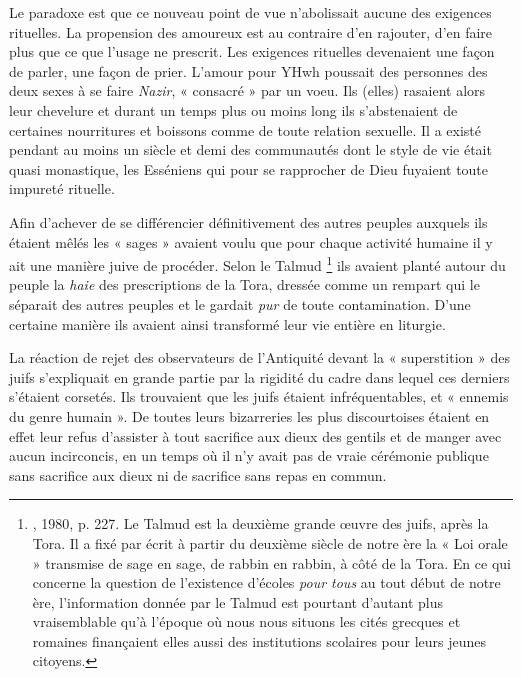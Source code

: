 Le paradoxe est que ce nouveau point de vue n'abolissait aucune des exigences rituelles. La propension des amoureux est au contraire d'en rajouter, d'en faire plus que ce que l'usage ne prescrit. Les exigences rituelles devenaient une façon de parler, une façon de prier. L'amour pour YHwh poussait des personnes des deux sexes à se faire \emph{Nazir}, « consacré » par un voeu. Ils (elles) rasaient alors leur chevelure et durant un temps plus ou moins long ils s'abstenaient de certaines nourritures et boissons comme de toute relation sexuelle. Il a existé pendant au moins un siècle et demi des communautés dont le style de vie était quasi monastique, les Esséniens qui pour se rapprocher de Dieu fuyaient toute impureté rituelle.
 
 Afin d'achever de se différencier définitivement des autres peuples auxquels ils étaient mêlés les « sages » avaient voulu que pour chaque activité humaine il y ait une manière juive de procéder. Selon le Talmud%
\footnote{, 1980, p. 227. Le Talmud est la deuxième grande œuvre des juifs, après la Tora. Il a fixé par écrit à partir du deuxième siècle de notre ère la « Loi orale » transmise de sage en sage, de rabbin en rabbin, à côté de la Tora. En ce qui concerne la question de l'existence d'écoles \emph{pour tous} au tout début de notre ère, l'information donnée par le Talmud est pourtant d'autant plus vraisemblable qu'à l'époque où nous nous situons les cités grecques et romaines finançaient elles aussi des institutions scolaires pour leurs jeunes citoyens.}
ils avaient planté autour du peuple la \emph{haie} des prescriptions de la Tora, dressée comme un rempart qui le séparait des autres peuples et le gardait \emph{pur} de toute contamination. D'une certaine manière ils avaient ainsi  transformé leur vie entière en liturgie. 

La réaction de rejet des observateurs de l'Antiquité devant la « superstition » des juifs s'expliquait en grande partie par la rigidité du cadre dans lequel ces derniers s'étaient corsetés. Ils trouvaient que les juifs étaient infréquentables, et « ennemis du genre humain ». De toutes leurs bizarreries les plus discourtoises étaient en effet leur refus d'assister à tout sacrifice aux dieux des gentils et de manger avec aucun incirconcis, en un temps où il n'y avait pas de vraie cérémonie publique sans sacrifice aux dieux ni de sacrifice sans repas en commun. 

